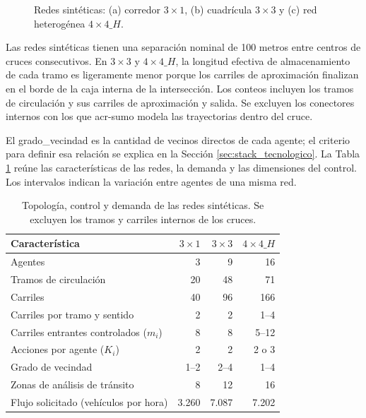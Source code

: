 \begin{figure}[H]
\centering

\caption{Redes sintéticas: (a) corredor $3\times1$, (b) cuadrícula $3\times3$ y (c) red heterogénea $4\times4\_H$.}
\label{fig:topologias_sinteticas}
\end{figure}

Las redes sintéticas tienen una separación nominal de 100 metros entre centros de cruces consecutivos. En $3\times3$ y $4\times4\_H$, la longitud efectiva de almacenamiento de cada tramo es ligeramente menor porque los carriles de aproximación finalizan en el borde de la caja interna de la intersección. Los conteos incluyen los tramos de circulación y sus carriles de aproximación y salida. Se excluyen los conectores internos con los que \acrshort{acr-sumo} modela las trayectorias dentro del cruce.

\begingroup
{}
El \gls{grado_vecindad} es la cantidad de vecinos directos de cada agente; el criterio para definir esa relación se explica en la Sección \ref{sec:stack_tecnologico}. La Tabla \ref{tab:escenarios_sinteticos} reúne las características de las redes, la demanda y las dimensiones del control. Los intervalos indican la variación entre agentes de una misma red.
\par
\endgroup

\begin{table}[H]
\centering
\caption{Topología, control y demanda de las redes sintéticas. Se excluyen los tramos y carriles internos de los cruces.}
\label{tab:escenarios_sinteticos}
\small
\begin{tabular}{lrrr}
\hline
\textbf{Característica} & \textbf{\boldmath$3\times1$} & \textbf{\boldmath$3\times3$} & \textbf{\boldmath$4\times4\_H$} \\
\hline
Agentes & 3 & 9 & 16 \\
Tramos de circulación & 20 & 48 & 71 \\
Carriles & 40 & 96 & 166 \\
Carriles por tramo y sentido & 2 & 2 & 1--4 \\
Carriles entrantes controlados ($m_i$) & 8 & 8 & 5--12 \\
Acciones por agente ($K_i$) & 2 & 2 & 2 o 3 \\
Grado de vecindad & 1--2 & 2--4 & 1--4 \\
Zonas de análisis de tránsito & 8 & 12 & 16 \\
Flujo solicitado (vehículos por hora) & 3.260 & 7.087 & 7.202 \\
\hline
\end{tabular}
\end{table}

